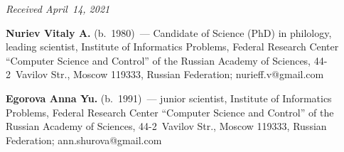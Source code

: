 \vspace*{-3pt}

  \hfill{\small\textit{Received April~14, 2021}}




\Contr

\noindent
\textbf{Nuriev Vitaly A.} (b.\ 1980)~--- Candidate of Science (PhD) in philology, leading scientist, 
Institute of Informatics Problems, Federal Research Center ``Computer Science and Control'' of the 
Russian Academy of Sciences, 44-2~Vavilov Str., Moscow 119333, Russian Federation; 
\mbox{nurieff.v@gmail.com}

\vspace*{3pt}

\noindent
\textbf{Egorova Anna Yu.} (b.\ 1991)~--- junior scientist, Institute of Informatics Problems, Federal 
Research Center ``Computer Science and Control'' of the Russian Academy of Sciences, 44-2~Vavilov 
Str., Moscow 119333, Russian Federation; \mbox{ann.shurova@gmail.com}
   
\label{end\stat}

\renewcommand{\bibname}{\protect\rm Литература}